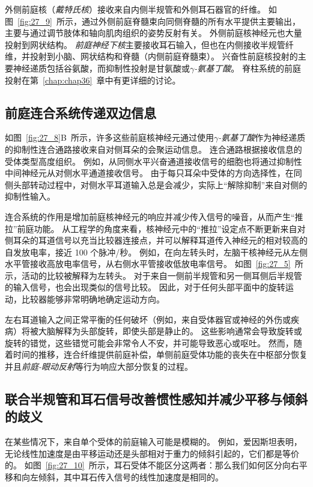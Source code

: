 外侧前庭核（\textit{戴特氏核}）接收来自内侧半规管和外侧耳石器官的纤维。
如图~\ref{fig:27_9}~所示，通过外侧前庭脊髓束向同侧脊髓的所有水平提供主要输出，主要与通过调节肢体和轴向肌肉组织的姿势反射有关。
外侧前庭核神经元也大量投射到网状结构。
\textit{前庭神经下核}主要接收耳石输入，但也在内侧接收半规管纤维，并投射到小脑、网状结构和脊髓（内侧前庭脊髓束）。
兴奋性前庭核投射的主要神经递质包括谷氨酸，而抑制性投射是甘氨酸或\textit{$\gamma$-氨基丁酸}。
脊柱系统的前庭投射在第~\ref{chap:chap36}~章中有更详细的讨论。



\subsection{前庭连合系统传递双边信息}

如图~\ref{fig:27_8}B~所示，许多这些前庭核神经元通过使用\textit{$\gamma$-氨基丁酸}作为神经递质的抑制性连合通路接收来自对侧耳朵的会聚运动信息。
连合通路根据接收信息的受体类型高度组织。
例如，从同侧水平兴奋通道接收信号的细胞也将通过抑制性中间神经元从对侧水平通道接收信号。
由于每只耳朵中受体的方向选择性，在同侧头部转动过程中，对侧水平耳道输入总是会减少，实际上“解除抑制”来自对侧的抑制性输入。


连合系统的作用是增加前庭核神经元的响应并减少传入信号的噪音，从而产生“推拉”前庭功能。
从工程学的角度来看，核神经元中的“推拉”设定点不断更新来自对侧耳朵的耳道信号以充当比较器连接点，并可以解释耳道传入神经元的相对较高的自发放电率，接近 100 个脉冲/秒。
例如，在向左转头时，左脑干核神经元从左侧水平管接收高放电率信号，从右侧水平管接收低放电率信号。
如图~\ref{fig:27_5}~所示，活动的比较被解释为左转头。
对于来自一侧前半规管和另一侧耳侧后半规管的输入信号，也会出现类似的信号比较。
因此，对于任何头部平面中的旋转运动，比较器能够非常明确地确定运动方向。


左右耳道输入之间正常平衡的任何破坏（例如，来自受体器官或神经的外伤或疾病）将被大脑解释为头部旋转，即使头部是静止的。
这些影响通常会导致旋转或旋转的错觉，这些错觉可能会非常令人不安，并可能导致恶心或呕吐。
然而，随着时间的推移，连合纤维提供前庭补偿，单侧前庭受体功能的丧失在中枢部分恢复并且\textit{前庭-眼动反射}等行为响应大部分恢复的过程。



\subsection{联合半规管和耳石信号改善惯性感知并减少平移与倾斜的歧义}

在某些情况下，来自单个受体的前庭输入可能是模糊的。
例如，爱因斯坦\cite{einstein1908relativitatsprinzip}表明，无论线性加速度是由平移运动还是头部相对于重力的倾斜引起的，它们都是等价的。
如图~\ref{fig:27_10}~所示，耳石受体不能区分这两者：那么我们如何区分向右平移和向左倾斜，其中耳石传入信号的线性加速度是相同的。


